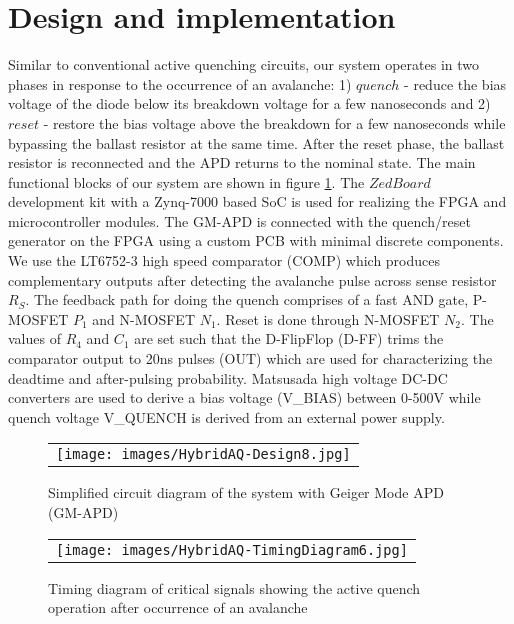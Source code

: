\section{Design and implementation}
\label{sec:design}
Similar to conventional active quenching circuits, our system operates in two phases in response to the occurrence of an avalanche: 1) $quench$ - reduce the bias voltage of the diode below its breakdown voltage for a few nanoseconds and 2) $reset$ - restore the bias voltage above the breakdown for a few nanoseconds while bypassing the ballast resistor at the same time. After the reset phase, the ballast resistor is reconnected and the APD returns to the nominal state. The main functional blocks of our system are shown in figure \ref{aq-design}. The $ZedBoard$ \cite{zedboard} development kit with a Zynq-7000 based SoC is used for realizing the FPGA and microcontroller modules. The GM-APD is connected with the quench/reset generator on the FPGA using a custom PCB with minimal discrete components. We use the LT6752-3 high speed comparator (COMP) which produces complementary outputs after detecting the avalanche pulse across sense resistor $R_S$. The feedback path for doing the quench comprises of a fast AND gate, P-MOSFET $P_1$ and N-MOSFET $N_1$. Reset is done through N-MOSFET $N_2$. The values of $R_4$ and $C_1$ are set such that the D-FlipFlop (D-FF) trims the comparator output to 20ns pulses (OUT) which are used for characterizing the deadtime and after-pulsing probability. Matsusada high voltage DC-DC converters are used to derive a bias voltage (V\_BIAS) between 0-500V while quench voltage V\_QUENCH is derived from an external power supply.
\begin{figure} [ht]
\begin{center}
\begin{tabular}{c} 
\texttt{[image: images/HybridAQ-Design8.jpg]}
\end{tabular}
\end{center}
\caption[] 
{ \label{aq-design} 
Simplified circuit diagram of the system with Geiger Mode APD (GM-APD)}
\end{figure}
\begin{figure} [ht]
\begin{center}
\begin{tabular}{c} 
\texttt{[image: images/HybridAQ-TimingDiagram6.jpg]}
\end{tabular}
\end{center}
\caption[] 
{ \label{aq-timingdiagram} 
Timing diagram of critical signals showing the active quench operation after occurrence of an avalanche}
\end{figure}
